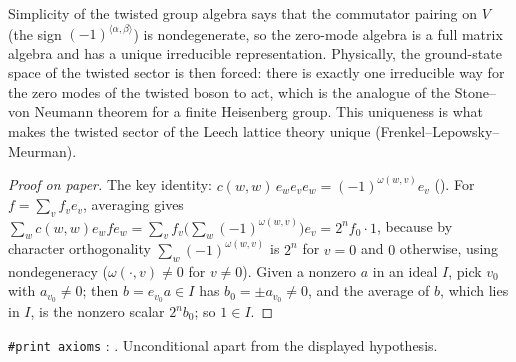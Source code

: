 \begin{physics}
Simplicity of the twisted group algebra says that the commutator pairing on $V$ (the sign $(-1)^{\langle\alpha,\beta\rangle}$) is nondegenerate, so the zero-mode algebra is a full matrix algebra and has a unique irreducible representation. Physically, the ground-state space of the twisted sector is then forced: there is exactly one irreducible way for the zero modes of the twisted boson to act, which is the analogue of the Stone--von Neumann theorem for a finite Heisenberg group. This uniqueness is what makes the twisted sector of the Leech lattice theory unique (Frenkel--Lepowsky--Meurman).
\end{physics}
\begin{proof}[Proof on paper]
The key identity: $c(w,w)\,e_we_ve_w=(-1)^{\omega(w,v)}e_v$ ().  For
$f=\sum_vf_ve_v$, averaging gives $\sum_wc(w,w)e_wfe_w=\sum_vf_v\bigl(\sum_w(-1)^{\omega(w,v)}\bigr)
e_v=2^nf_0\cdot1$, because by character orthogonality $\sum_w(-1)^{\omega(w,v)}$ is $2^n$ for $v=0$
and $0$ otherwise, using nondegeneracy ($\omega(\cdot,v)\ne0$ for $v\ne0$).  Given a nonzero $a$ in
an ideal $I$, pick $v_0$ with $a_{v_0}\ne0$; then $b=e_{v_0}a\in I$ has $b_0=\pm a_{v_0}\ne0$, and the
average of $b$, which lies in $I$, is the nonzero scalar $2^nb_0$; so $1\in I$.
\end{proof}
\begin{status}
\texttt{\#print axioms} : .  Unconditional apart from the displayed hypothesis.
\end{status}


